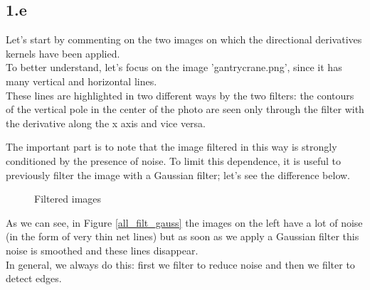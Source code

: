 \documentclass{article}
\begin{document}
\subsection{1.e}

Let's start by commenting on the two images on which the directional 
derivatives kernels have been applied.\\
To better understand, let's focus on the image 'gantrycrane.png', since it has 
many vertical and horizontal lines.\\
These lines are highlighted in two different ways by the two filters: 
the contours of the vertical pole in the center of the photo are seen only 
through the filter with the derivative along the x axis and vice versa.

The important part is to note that the image filtered in this way is strongly 
conditioned by the presence of noise. 
To limit this dependence, it is useful to previously filter the image  with 
a Gaussian filter; let's see the difference below.



\begin{figure}[!h]
	\begin{center}
		\hspace{2mm}
		
	\end{center}
	\captionsetup{justification=raggedright,margin=1cm}
	\caption{Filtered images}
	\label{Filtered_all}
\end{figure}

As we can see, in Figure \ref{all_filt_gauss} the images on the left have a lot of noise (in the form of very
thin net lines) but as soon as we apply a Gaussian filter this noise is 
smoothed and these lines disappear.\\
In general, we always do this: first we filter to reduce noise and
then we filter to detect edges.
\end{document}
